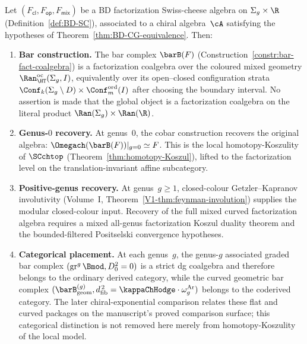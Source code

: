 \begin{theorem}
\label{thm:factorization-SC-koszul}
Let $(F_{\mathsf{cl}}, F_{\mathsf{op}}, F_{\mathsf{mix}})$ be a
BD factorization Swiss-cheese algebra on $\Sigma_g \times \R$
\textup{(}Definition~\textup{\ref{def:BD-SC})}, associated to a
chiral algebra~$\cA$ satisfying the hypotheses of
Theorem~\textup{\ref{thm:BD-CG-equivalence}}. Then:
\begin{enumerate}[label=\textup{(\roman*)}]
\item \textbf{Bar construction.} The bar complex
 $\barB(F)$ \textup{(}Construction~\textup{\ref{constr:bar-fact-coalgebra})}
 is a factorization coalgebra over the coloured mixed geometry
 $\Ran^{\mathrm{oc}}_{\HT}(\Sigma_g,I)$, equivalently over its
 open--closed configuration strata
 $\Conf_k(\Sigma_g\setminus D)\times\Conf_m^{\mathrm{ord}}(I)$
 after choosing the boundary interval. No assertion is made that
 the global object is a factorization coalgebra on the literal
 product $\Ran(\Sigma_g)\times\Ran(\R)$.

\item \textbf{Genus-$0$ recovery.} At genus~$0$, the cobar
 construction recovers the original algebra:
 $\Omegach(\barB(F))|_{g=0} \simeq F$. This is the local
 homotopy-Koszulity of $\SCchtop$
 \textup{(}Theorem~\textup{\ref{thm:homotopy-Koszul})}, lifted to
 the factorization level on the translation-invariant affine
 subcategory.

\item \textbf{Positive-genus recovery.} At genus~$g \geq 1$,
 closed-colour Getzler--Kapranov involutivity
 \textup{(}Volume~I, Theorem~\textup{\ref*{V1-thm:feynman-involution})}
 supplies the modular closed-colour input. Recovery of the full
 mixed curved factorization algebra requires a mixed
 all-genus factorization Koszul duality theorem and the
 bounded-filtered Positselski convergence hypotheses.

\item \textbf{Categorical placement.} At each genus~$g$, the
 genus-$g$ associated graded bar complex
 $(\mathrm{gr}^g\, \Bmod, D_0^2 = 0)$ is a strict dg coalgebra
 and therefore belongs to the ordinary derived category,
 while the curved geometric bar complex
 $(\barB^{(g)}_{\mathrm{geom}}, \dfib^{\,2} =
 \kappaChHodge \cdot \omega_g^{\mathrm{Ar}})$ belongs to the coderived category.
 The later chiral-exponential comparison relates these flat and
 curved packages on the manuscript's proved comparison surface;
 this categorical distinction is not removed here merely from
 homotopy-Koszulity of the local model.
\end{enumerate}
\end{theorem}

